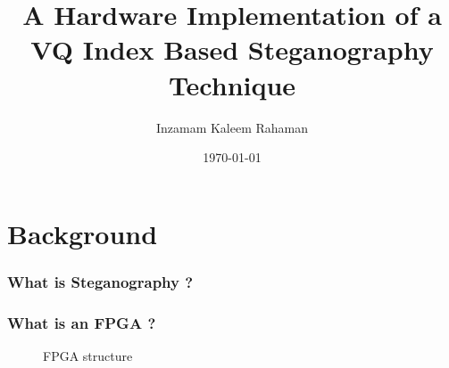 \documentclass[10pt, compress]{beamer}
\title{A Hardware Implementation of a VQ Index Based Steganography Technique}
\subtitle{}
\date{\today}
\author{Inzamam Kaleem Rahaman}
\institute{University of the West Indies, St Augustine}
\begin{document}
\maketitle

\section{Background}

\begin{frame}[fragile]
  \frametitle{What is Steganography ?}

    



  
  \begin{figure}
        \scalebox{.8}{}
   \end{figure}
  
\end{frame}

\begin{frame}[fragile]
  \frametitle{What is an FPGA ?}
  
    \begin{figure}
        \scalebox{.8}{}
        \caption{FPGA structure}
    \end{figure}


\end{frame}
\end{document}
